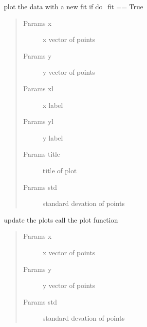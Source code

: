 \documentclass[letterpaper,10pt,english]{sphinxmanual}
\begin{document}
\begin{fulllineitems}
\begin{fulllineitems}
\label{PopPlot:Visualplotterwidget.PopPlot.plot}
plot the data with a new fit if do\_fit == True
\begin{quote}\begin{description}
\item[{Params x}] \leavevmode
x vector of points

\item[{Params y}] \leavevmode
y vector of points

\item[{Params xl}] \leavevmode
x label

\item[{Params yl}] \leavevmode
y label

\item[{Params title}] \leavevmode
title of plot

\item[{Params std}] \leavevmode
standard devation of points

\end{description}\end{quote}

\end{fulllineitems}


\begin{fulllineitems}
\label{PopPlot:Visualplotterwidget.PopPlot.update}
update the plots call the plot function
\begin{quote}\begin{description}
\item[{Params x}] \leavevmode
x vector of points

\item[{Params y}] \leavevmode
y vector of points

\item[{Params std}] \leavevmode
standard devation of points

\end{description}\end{quote}

\end{fulllineitems}



\end{fulllineitems}
\end{document}
